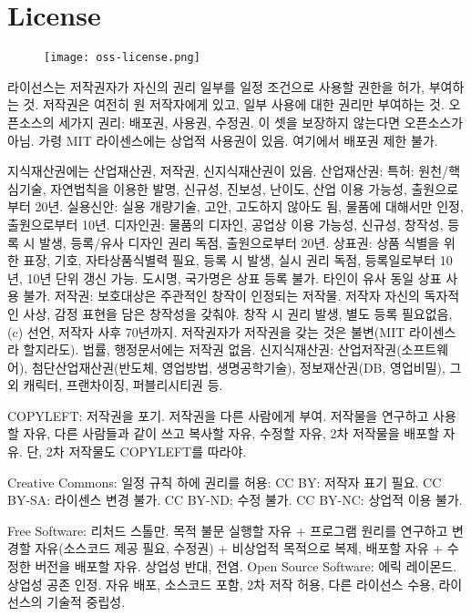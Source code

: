 \section{License}

\begin{figure}[h] \centering \texttt{[image: oss-license.png]} \end{figure}

\bitmz
  \itm 라이선스는 저작권자가 자신의 권리 일부를 일정 조건으로 사용할 권한을 허가, 부여하는 것. 저작권은 여전히 원 저작자에게 있고, 일부 사용에 대한 권리만 부여하는 것.
  \itm 오픈소스의 세가지 권리: 배포권, 사용권, 수정권. 이 셋을 보장하지 않는다면 오픈소스가 아님. 가령 MIT 라이센스에는 상업적 사용권이 있음. 여기에서 배포권 제한 불가.

  \itm 지식재산권에는 산업재산권, 저작권, 신지식재산권이 있음.
  \bitmz
    \itm 산업재산권:
    \bitmz
      \itm 특허: 원천/핵심기술, 자연법칙을 이용한 발명, 신규성, 진보성, 난이도, 산업 이용 가능성, 출원으로부터 20년.
      \itm 실용신안: 실용 개량기술, 고안, 고도하지 않아도 됨, 물품에 대해서만 인정, 출원으로부터 10년.
      \itm 디자인권: 물품의 디자인, 공업상 이용 가능성, 신규성, 창작성, 등록 시 발생, 등록/유사 디자인 권리 독점, 출원으로부터 20년.
      \itm 상표권: 상품 식별을 위한 표장, 기호, 자타상품식별력 필요, 등록 시 발생, 실시 권리 독점, 등록일로부터 10년, 10년 단위 갱신 가능. 도시명, 국가명은 상표 등록 불가. 타인이 유사 동일 상표 사용 불가.
    \eitmz
    \itm 저작권: 보호대상은 주관적인 창작이 인정되는 저작물. 저작자 자신의 독자적인 사상, 감정 표현을 담은 창작성을 갖춰야. 창작 시 권리 발생, 별도 등록 필요없음, (c) 선언, 저작자 사후 70년까지. 저작권자가 저작권을 갖는 것은 불변(MIT 라이센스라 할지라도). 법률, 행정문서에는 저작권 없음.
    \itm 신지식재산권: 산업저작권(소프트웨어), 첨단산업재산권(반도체, 영업방법, 생명공학기술), 정보재산권(DB, 영업비밀), 그 외 캐릭터, 프랜차이징, 퍼블리시티권 등.
  \eitmz

  \itm COPYLEFT: 저작권을 포기. 저작권을 다른 사람에게 부여. 저작물을 연구하고 사용할 자유, 다른 사람들과 같이 쓰고 복사할 자유, 수정할 자유, 2차 저작물을 배포할 자유. 단, 2차 저작물도 COPYLEFT를 따라야.

  \itm Creative Commons: 일정 규칙 하에 권리를 허용:
  \bitmz
    \itm CC BY: 저작자 표기 필요.
    \itm CC BY-SA: 라이센스 변경 불가.
    \itm CC BY-ND: 수정 불가.
    \itm CC BY-NC: 상업적 이용 불가.
  \eitmz

  \itm Free Software: 리처드 스톨만. 목적 불문 실행할 자유 + 프로그램 원리를 연구하고 변경할 자유(소스코드 제공 필요, 수정권) + 비상업적 목적으로 복제, 배포할 자유 + 수정한 버전을 배포할 자유. 상업성 반대, 전염.
  \itm Open Source Software: 에릭 레이몬드. 상업성 공존 인정. 자유 배포, 소스코드 포함, 2차 저작 허용, 다른 라이선스 수용, 라이선스의 기술적 중립성.


